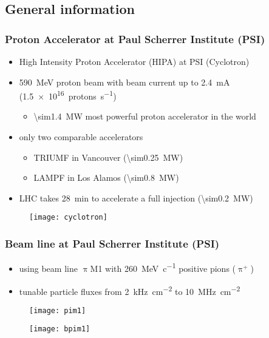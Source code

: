 \subsection{General information}
\begin{frame}
	\frametitle{Proton Accelerator at Paul Scherrer Institute (PSI)}
	\begin{itemize}
		\setlength{\itemsep}{\fill}
		\item High Intensity Proton Accelerator (HIPA) at PSI (Cyclotron)
		\item \SI{590}{\mega\electronvolt} proton beam with beam current up to \SI{2.4}{\milli\ampere} (\SI{1.5e16}{protons\per s})
		\begin{itemize}
			\vspace*{4pt}
			\item \SI{\sim1.4}{\mega\watt} \ra most powerful proton accelerator in the world
		\end{itemize}
		\vspace*{4pt}
		\item only two comparable accelerators
		\begin{itemize}
			\vspace*{4pt}
			\item TRIUMF in Vancouver (\SI{\sim0.25}{\mega\watt})
			\item LAMPF in Los Alamos (\SI{\sim0.8}{\mega\watt})
		\end{itemize}
		\item LHC takes \SI{28}{\minute} to accelerate a full injection (\SI{\sim0.2}{\mega\watt})
	\end{itemize}
	\begin{figure}
		\centering
		\texttt{[image: cyclotron]}
	\end{figure}
\end{frame}
\begin{frame}
	\frametitle{Beam line at Paul Scherrer Institute (PSI)}
	\begin{minipage}[c][.75\textheight]{6.5cm}
		\begin{itemize}
			\setlength{\itemsep}{\fill}
			\item using beam line $\uppi$M1 with \SI{260}{\mega\electronvolt\per c} positive pions ($\uppi^+$)
			\item tunable particle fluxes from \SI{2}{\kilo\hertz\per cm^2} to \SI{10}{\mega\hertz\per cm^2}
		\end{itemize}
		\begin{figure}
			\centering
			\texttt{[image: pim1]}
		\end{figure}
	\end{minipage}
	\begin{minipage}{4.5cm}
		\begin{figure}
			\centering
			\texttt{[image: bpim1]}
		\end{figure}
	\end{minipage}
\end{frame}

